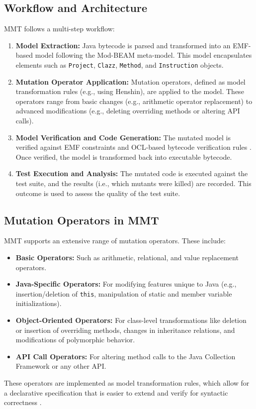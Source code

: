 \documentclass[sigplan, nonacm]{acmart}
\begin{document}
\subsection{Workflow and Architecture}
MMT follows a multi-step workflow:
\begin{enumerate}[noitemsep]
	\item \textbf{Model Extraction:} Java bytecode is parsed and transformed into an EMF-based model following the Mod-BEAM meta-model. This model encapsulates elements such as \texttt{Project}, \texttt{Clazz}, \texttt{Method}, and \texttt{Instruction} objects.
	\item \textbf{Mutation Operator Application:} Mutation operators, defined as model transformation rules (e.g., using Henshin), are applied to the model. These operators range from basic changes (e.g., arithmetic operator replacement) to advanced modifications (e.g., deleting overriding methods or altering API calls).
	\item \textbf{Model Verification and Code Generation:} The mutated model is verified against EMF constraints and OCL-based bytecode verification rules \cite{Bockisch2024demonstration}. Once verified, the model is transformed back into executable bytecode.
	\item \textbf{Test Execution and Analysis:} The mutated code is executed against the test suite, and the results (i.e., which mutants were killed) are recorded. This outcome is used to assess the quality of the test suite.
\end{enumerate}

\subsection{Mutation Operators in MMT}
MMT supports an extensive range of mutation operators. These include:
\begin{itemize}[noitemsep]
	\item \textbf{Basic Operators:} Such as arith\-metic, relational, and value replace\-ment operators.
	\item \textbf{Java-Specific Operators:} For modifying features unique to Java (e.g., insertion/deletion of \texttt{this}, mani\-pulation of static and member variable initial\-izations).
	\item \textbf{Object-Oriented Operators:} For class-level transformations like deletion or insertion of overriding methods, changes in inheritance relations, and modifications of polymorphic behavior.
	\item \textbf{API Call Operators:} For altering method calls to the Java Collection Framework or any other API.
\end{itemize}
These operators are implemented as model transformation rules, which allow for a declarative specification that is easier to extend and verify for syntactic correctness \cite{Bockisch2024}.
\end{document}
